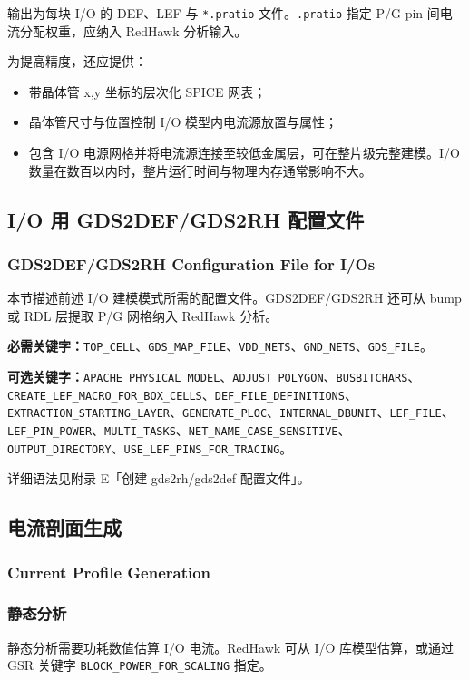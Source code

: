 输出为每块 I/O 的 DEF、LEF 与 \texttt{*.pratio} 文件。\texttt{.pratio} 指定 P/G pin 间电流分配权重，应纳入 RedHawk 分析输入。

为提高精度，还应提供：
\begin{itemize}
  \item 带晶体管 x,y 坐标的层次化 SPICE 网表；
  \item 晶体管尺寸与位置控制 I/O 模型内电流源放置与属性；
  \item 包含 I/O 电源网格并将电流源连接至较低金属层，可在整片级完整建模。I/O 数量在数百以内时，整片运行时间与物理内存通常影响不大。
\end{itemize}

\subsection{I/O 用 GDS2DEF/GDS2RH 配置文件}
\subsubsection*{GDS2DEF/GDS2RH Configuration File for I/Os}

本节描述前述 I/O 建模模式所需的配置文件。GDS2DEF/GDS2RH 还可从 bump 或 RDL 层提取 P/G 网格纳入 RedHawk 分析。

\textbf{必需关键字：}\texttt{TOP\_CELL}、\texttt{GDS\_MAP\_FILE}、\texttt{VDD\_NETS}、\texttt{GND\_NETS}、\texttt{GDS\_FILE}。

\textbf{可选关键字：}\texttt{APACHE\_PHYSICAL\_MODEL}、\texttt{ADJUST\_POLYGON}、\texttt{BUSBITCHARS}、\texttt{CREATE\_LEF\_MACRO\_FOR\_BOX\_CELLS}、\texttt{DEF\_FILE\_DEFINITIONS}、\texttt{EXTRACTION\_STARTING\_LAYER}、\texttt{GENERATE\_PLOC}、\texttt{INTERNAL\_DBUNIT}、\texttt{LEF\_FILE}、\texttt{LEF\_PIN\_POWER}、\texttt{MULTI\_TASKS}、\texttt{NET\_NAME\_CASE\_SENSITIVE}、\texttt{OUTPUT\_DIRECTORY}、\texttt{USE\_LEF\_PINS\_FOR\_TRACING}。

详细语法见附录 E「创建 gds2rh/gds2def 配置文件」。

\subsection{电流剖面生成}
\subsubsection*{Current Profile Generation}

\subsubsection{静态分析}
静态分析需要功耗数值估算 I/O 电流。RedHawk 可从 I/O 库模型估算，或通过 GSR 关键字 \texttt{BLOCK\_POWER\_FOR\_SCALING} 指定。

